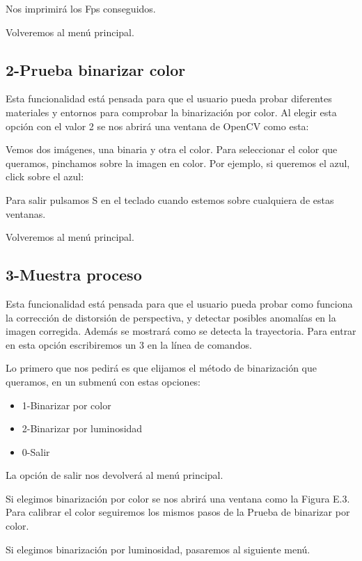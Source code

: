 Nos imprimirá los Fps conseguidos.

Volveremos al menú principal.

\subsection{2-Prueba binarizar color}
Esta funcionalidad está pensada para que el usuario pueda probar diferentes materiales y entornos para comprobar la binarización por color. Al elegir esta opción con el valor 2 se nos abrirá una ventana de OpenCV como esta:


Vemos dos imágenes, una binaria y otra el color. Para seleccionar el color que queramos, pinchamos sobre la imagen en color. Por ejemplo, si queremos el azul, click sobre el azul:


Para salir pulsamos S en el teclado cuando estemos sobre cualquiera de estas ventanas.

Volveremos al menú principal.

\subsection{3-Muestra proceso}
Esta funcionalidad está pensada para que el usuario pueda probar como funciona la corrección de distorsión de perspectiva, y detectar posibles anomalías en la imagen corregida. Además se mostrará como se detecta la trayectoria. Para entrar en esta opción escribiremos un 3 en la línea de comandos.

Lo primero que nos pedirá es que elijamos el método de binarización que queramos, en un submenú con estas opciones:

\begin{itemize}
	\item 1-Binarizar por color
	\item 2-Binarizar por luminosidad
	\item 0-Salir
\end{itemize}

La opción de salir nos devolverá al menú principal.

Si elegimos binarización por color se nos abrirá una ventana como la Figura E.3. Para calibrar el color seguiremos los mismos pasos de la Prueba de binarizar por color.

Si elegimos binarización por luminosidad, pasaremos al siguiente menú.

